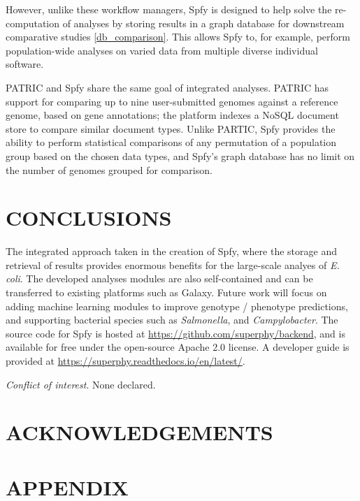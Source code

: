 \documentclass{article}
\begin{document}
However, unlike these workflow managers, Spfy is designed to help solve the re-computation of analyses by storing results in a graph database for downstream comparative studies \ref{db_comparison}. This allows Spfy to, for example, perform population-wide analyses on varied data from multiple diverse individual software.

\small 

PATRIC \cite{wattam2016improvements} and Spfy share the same goal of integrated analyses. PATRIC has support for comparing up to nine user-submitted genomes against a reference genome, based on gene annotations; the platform indexes a NoSQL document store to compare similar document types. Unlike PARTIC, Spfy provides the ability to perform statistical comparisons of any permutation of a population group based on the chosen data types, and Spfy's graph database has no limit on the number of genomes grouped for comparison.

\section{CONCLUSIONS}

The integrated approach taken in the creation of Spfy, where the storage and retrieval of results provides enormous benefits for the large-scale analyes of \textit{E. coli}. The developed analyses modules are also self-contained and can be transferred to existing platforms such as Galaxy. Future work will focus on adding machine learning modules to improve genotype / phenotype predictions, and supporting bacterial species such as \textit{Salmonella}, and \textit{Campylobacter}. The source code for Spfy is hosted at \url{https://github.com/superphy/backend}, and is available for free under the open-source Apache 2.0 license. A developer guide is provided at \url{https://superphy.readthedocs.io/en/latest/}.

\textit{Conflict of interest}. None declared.

\section{ACKNOWLEDGEMENTS}

\newpage




\newpage

\section{APPENDIX}
\end{document}
